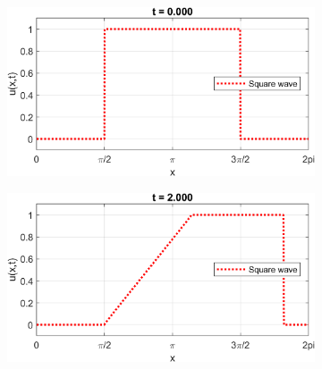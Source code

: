 \documentclass{myproject}
\begin{document}
\begin{figure}[h]
    \centering
    \begin{subfigure}[b]{0.40\textwidth}
       \includegraphics[width=1\linewidth]{square_wave_0.png}
       \caption{}
    \end{subfigure}\qquad
    \begin{subfigure}[b]{0.40\textwidth}
       \includegraphics[width=1\linewidth]{square_wave_2.png}
       \caption{}
    \end{subfigure}

    \vspace{\floatsep}


\end{figure}
\end{document}
